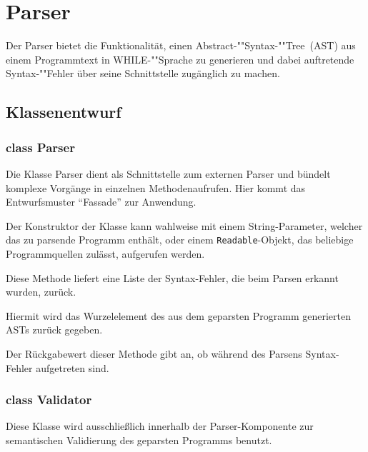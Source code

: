 \section{Parser}

Der Parser bietet die Funktionalität, einen Abstract-""Syntax-""Tree~(AST) aus einem Programmtext in WHILE-""Sprache zu generieren und dabei auftretende Syntax-""Fehler über seine Schnittstelle zugänglich zu machen.

\subsection{Klassenentwurf}

\subsubsection{class Parser}

Die Klasse Parser dient als Schnittstelle zum externen Parser und bündelt komplexe Vorgänge in einzelnen Methodenaufrufen. Hier kommt das Entwurfsmuster "`Fassade"' zur Anwendung.

\begin{description}
		Der Konstruktor der Klasse kann wahlweise mit einem String-Parameter, welcher das zu parsende Programm enthält, oder einem \texttt{Readable}-Objekt, das beliebige Programmquellen zulässt, aufgerufen werden.

		Diese Methode liefert eine Liste der Syntax-Fehler, die beim Parsen erkannt wurden, zurück.

		Hiermit wird das Wurzelelement des aus dem geparsten Programm generierten ASTs zurück gegeben.

		Der Rückgabewert dieser Methode gibt an, ob während des Parsens Syntax-Fehler aufgetreten sind.
\end{description}

\subsubsection{class Validator}

Diese Klasse wird ausschließlich innerhalb der Parser-Komponente zur semantischen Validierung des geparsten Programms benutzt.

